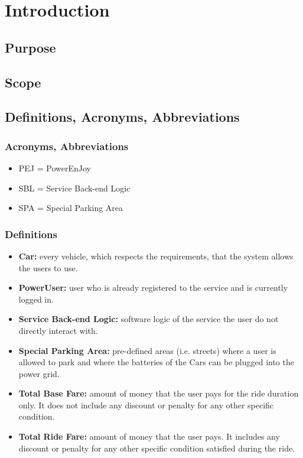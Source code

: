 \section{Introduction}
\subsection{Purpose}


\subsection{Scope}


\subsection{Definitions, Acronyms, Abbreviations}
\subsubsection{Acronyms, Abbreviations}
\begin{itemize}
    \item PEJ = PowerEnJoy
    \item SBL = Service Back-end Logic
    \item SPA = Special Parking Area
\end{itemize}
\subsubsection{Definitions}
\begin{itemize}
    \item \textbf{Car:} every vehicle, which respects the requirements, that the system allows the users to use.
    \item\textbf{PowerUser:} user who is already registered to the service and is currently logged in.
    \item \textbf{Service Back-end Logic:} software logic of the service the user do not directly interact with.
    \item \textbf{Special Parking Area:} pre-defined areas (i.e. streets) where a user is allowed to park and where the batteries of the Cars can be plugged into the power grid.
    \item \textbf{Total Base Fare:} amount of money that the user pays for the ride duration only. It does not include any discount or penalty for any other specific condition.
    \item \textbf{Total Ride Fare:} amount of money that the user pays. It includes any discount or penalty for any other specific condition satisfied during the ride.
\end{itemize}

